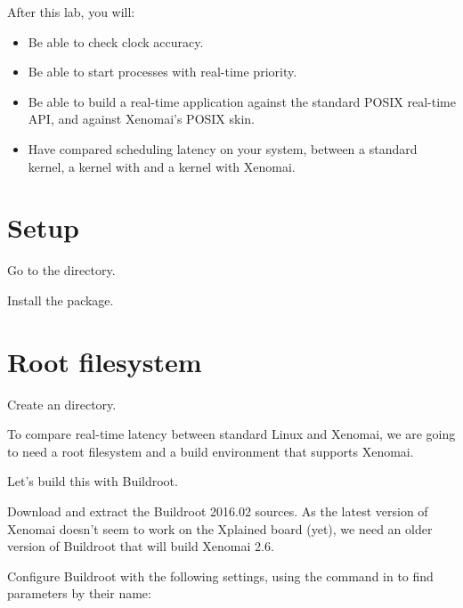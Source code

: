 
After this lab, you will:
\begin{itemize}
\item Be able to check clock accuracy.
\item Be able to start processes with real-time priority.
\item Be able to build a real-time application against the standard
POSIX real-time API, and against Xenomai's POSIX skin.
\item Have compared scheduling latency on your system, between a
  standard kernel, a kernel with  and a kernel
  with Xenomai.
\end{itemize}

\section{Setup}

Go to the  directory.

Install the  package.

\section{Root filesystem}

Create an  directory.

To compare real-time latency between standard Linux and Xenomai, we
are going to need a root filesystem and a build environment that
supports Xenomai.

Let's build this with Buildroot.

Download and extract the Buildroot 2016.02 sources. As the latest
version of Xenomai doesn't seem to work on the Xplained board (yet),
we need an older version of Buildroot that will build Xenomai 2.6.

Configure Buildroot with the following settings,
using the \code{/} command in  to find parameters by their name:


